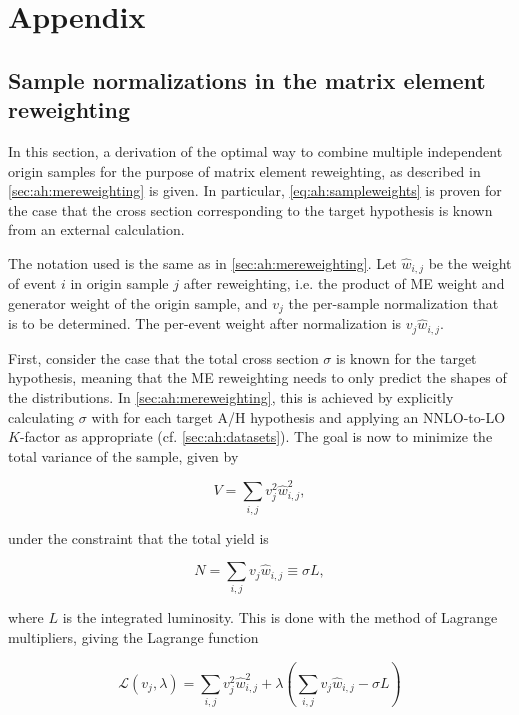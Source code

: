 \chapter{Appendix}

\section{Sample normalizations in the matrix element reweighting}
\label{app:mereweighting}
In this section, a derivation of the optimal way to combine multiple independent origin samples for the purpose of matrix element reweighting, as described in \cref{sec:ah:mereweighting} is given. In particular, \cref{eq:ah:sampleweights} is proven for the case that the cross section corresponding to the target hypothesis is known from an external calculation.

The notation used is the same as in \cref{sec:ah:mereweighting}. Let $\hat{w}_{i,j}$ be the weight of event $i$ in origin sample $j$ after reweighting, i.e. the product of ME weight and generator weight of the origin sample, and $v_j$ the per-sample normalization that is to be determined. The per-event weight after normalization is $v_j \hat{w}_{i,j}$. 

First, consider the case that the total cross section $\sigma$ is known for the target hypothesis, meaning that the ME reweighting needs to only predict the shapes of the distributions. In \cref{sec:ah:mereweighting}, this is achieved by explicitly calculating $\sigma$ with \amcatnlo for each target A/H hypothesis and applying an NNLO-to-LO $K$-factor as appropriate (cf. \cref{sec:ah:datasets}). The goal is now to minimize the total variance of the sample, given by

\begin{equation}
    V = \sum_{i,j} v_j^2 \hat{w}_{i,j}^2 ,
\end{equation}

\noindent under the constraint that the total yield is

\begin{equation}
\label{eq:app:mecontstraint}
    N = \sum_{i,j} v_j \hat{w}_{i,j} \equiv \sigma L ,
\end{equation}

\noindent where $L$ is the integrated luminosity. This is done with the method of Lagrange multipliers, giving the Lagrange function

\begin{equation}
    \mathcal{L} (v_j, \lambda) = \sum_{i,j} v_j^2 \hat{w}_{i,j}^2 + \lambda \left( \sum_{i,j} v_j \hat{w}_{i,j} - \sigma L \right)
\end{equation}


